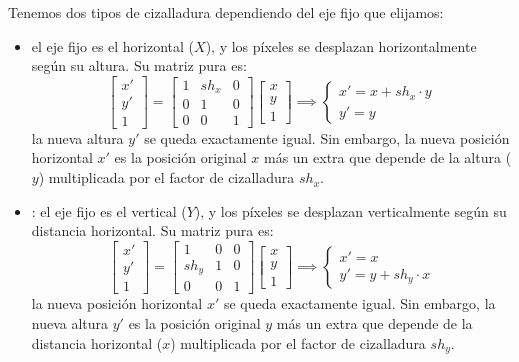 \noindent
Tenemos dos tipos de cizalladura dependiendo del eje fijo que elijamos:
\begin{itemize}
    \item {} el eje fijo es el horizontal ($X$), y los píxeles se desplazan horizontalmente según su altura. Su matriz pura es:
    $$\begin{bmatrix} x' \\ y' \\ 1 \end{bmatrix} = \begin{bmatrix} 1 & sh_x & 0 \\ 0 & 1 & 0 \\ 0 & 0 & 1 \end{bmatrix} \begin{bmatrix} x \\ y \\ 1 \end{bmatrix} \implies \begin{cases} x' = x + sh_x \cdot y \\ y' = y \end{cases}$$
    la nueva altura $y'$ se queda exactamente igual. Sin embargo, la nueva posición horizontal $x'$ es la posición original $x$ más un extra que depende de la altura ($y$) multiplicada por el factor de cizalladura $sh_x$.
    
    \item {}: el eje fijo es el vertical ($Y$), y los píxeles se desplazan verticalmente según su distancia horizontal. Su matriz pura es:
    $$\begin{bmatrix} x' \\ y' \\ 1 \end{bmatrix} = \begin{bmatrix} 1 & 0 & 0 \\ sh_y & 1 & 0 \\ 0 & 0 & 1 \end{bmatrix} \begin{bmatrix} x \\ y \\ 1 \end{bmatrix} \implies \begin{cases} x' = x \\ y' = y + sh_y \cdot x \end{cases}$$
    la nueva posición horizontal $x'$ se queda exactamente igual. Sin embargo, la nueva altura $y'$ es la posición original $y$ más un extra que depende de la distancia horizontal ($x$) multiplicada por el factor de cizalladura $sh_y$.
\end{itemize}

